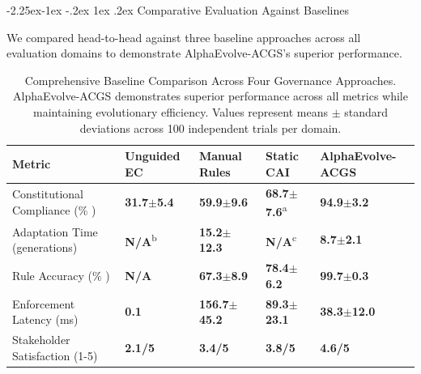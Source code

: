 \documentclass[manuscript,screen,review,anonymous,9pt]{acmart}
\makeatletter
\renewcommand\subsection{\@startsection{subsection}{2}{\z@}%
  {-2.25ex\@plus -1ex \@minus -.2ex}%
  {1ex \@plus .2ex}%
  {\normalfont\large\bfseries}}
\newcommand{\tablesize}{\tiny}
\newcommand{\tablenumfmt}[1]{\textbf{#1}}
\newcommand{\tableheader}[1]{\textbf{#1}}
\makeatother
\begin{document}
\subsection{Comparative Evaluation Against Baselines}
\label{subsec:comparative_evaluation}

We compared head-to-head against three baseline approaches across all evaluation domains to demonstrate AlphaEvolve-ACGS's superior performance.

\begin{table}[htbp]
	\centering
	\caption{Comprehensive Baseline Comparison Across Four Governance Approaches. AlphaEvolve-ACGS demonstrates superior performance across all metrics while maintaining evolutionary efficiency. Values represent means $ \pm $ standard deviations across 100 independent trials per domain.}
	\label{tab:baseline_comparison}
	\tablesize
	\begin{tabular}{@{}l>{\centering\arraybackslash}p{1.1cm}>{\centering\arraybackslash}p{1.1cm}>{\centering\arraybackslash}p{1.1cm}>{\centering\arraybackslash}p{1.2cm}@{}}
		\toprule
		\tableheader{Metric}           & \tableheader{Unguided EC} & \tableheader{Manual Rules} & \tableheader{Static CAI}    & \tableheader{AlphaEvolve-ACGS}   \\
		\midrule
		Constitutional Compliance (\% ) & \tablenumfmt{31.7$\pm$5.4}                  & \tablenumfmt{59.9$\pm$9.6}                   & \tablenumfmt{68.7$\pm$7.6}\textsuperscript{a} & \textbf{\tablenumfmt{94.9$\pm$3.2}}  \\
		Adaptation Time (generations)  & \tablenumfmt{N/A}\textsuperscript{b}    & \tablenumfmt{15.2$\pm$12.3}                  & \tablenumfmt{N/A}\textsuperscript{c}      & \textbf{\tablenumfmt{8.7$\pm$2.1}}   \\
		Rule Accuracy (\% )             & \tablenumfmt{N/A}                       & \tablenumfmt{67.3$\pm$8.9}                   & \tablenumfmt{78.4$\pm$6.2}                    & \textbf{\tablenumfmt{99.7$\pm$0.3}}  \\
		Enforcement Latency (ms)       & \tablenumfmt{0.1}                       & \tablenumfmt{156.7$\pm$45.2}                 & \tablenumfmt{89.3$\pm$23.1}                   & \textbf{\tablenumfmt{38.3$\pm$12.0}} \\
		Stakeholder Satisfaction (1-5) & \tablenumfmt{2.1/5}                     & \tablenumfmt{3.4/5}                      & \tablenumfmt{3.8/5}                       & \textbf{\tablenumfmt{4.6/5}}     \\
		\bottomrule
	\end{tabular}

\end{table}
\end{document}
